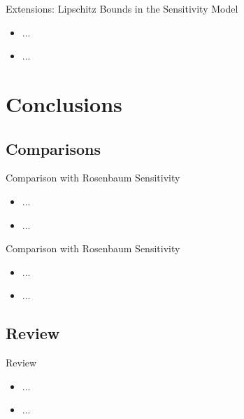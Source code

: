 \documentclass{beamer}
\begin{document}
\begin{frame}{Extensions: Lipschitz Bounds in the Sensitivity Model}

\begin{itemize}
  \itemsep12pt
  \item ...
  \item ...
\end{itemize}

\end{frame}

\section{Conclusions}
\subsection{Comparisons}

\begin{frame}{Comparison with Rosenbaum Sensitivity}

\begin{itemize}
  \itemsep12pt
  \item ...
  \item ...
\end{itemize}

\end{frame}


\begin{frame}{Comparison with Rosenbaum Sensitivity}

\begin{itemize}
  \itemsep12pt
  \item ...
  \item ...
\end{itemize}

\end{frame}

\subsection{Review}

\begin{frame}{Review}

\begin{itemize}
  \itemsep12pt
  \item ...
  \item ...
\end{itemize}

\end{frame}
\end{document}
